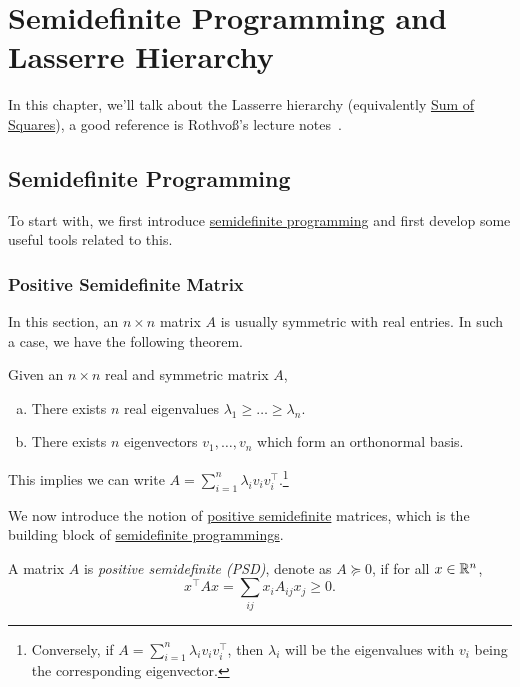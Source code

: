 \chapter{Semidefinite Programming and Lasserre Hierarchy}
In this chapter, we'll talk about the Lasserre hierarchy (equivalently \href{https://en.wikipedia.org/wiki/Sum-of-squares_optimization}{Sum of Squares}), a good reference is Rothvoß's lecture notes~\cite{LasserreHierarchy}.

\section{Semidefinite Programming}
To start with, we first introduce \hyperref[def:SDP]{semidefinite programming} and first develop some useful tools related to this.
\subsection{Positive Semidefinite Matrix}
In this section, an \(n\times n\) matrix \(A\) is usually symmetric with real entries. In such a case, we have the following theorem.

\begin{prev}
	Given an \(n\times n\) real and symmetric matrix \(A\),
	\begin{enumerate}[(a)]
		\item There exists \(n\) real eigenvalues \(\lambda _1 \geq \ldots \geq \lambda _n \).
		\item There exists \(n\) eigenvectors \(v_1, \ldots  , v_n\) which form an orthonormal basis.
	\end{enumerate}
	This implies we can write \(A = \sum_{i=1}^n \lambda _i v_i v_i ^{\top}\).\footnote{Conversely, if \(A= \sum_{i=1}^n \lambda _i v_i v_i ^{\top}  \), then \(\lambda _i\) will be the eigenvalues with \(v_i\) being the corresponding eigenvector.}
\end{prev}

We now introduce the notion of \hyperref[def:PSD]{positive semidefinite} matrices, which is the building block of \hyperref[def:SDP]{semidefinite programmings}.

\begin{definition}\label{def:PSD}
	A matrix \(A\) is \emph{positive semidefinite (PSD)}, denote as \(A \succeq 0\), if for all \(x\in \mathbb{\MakeUppercase{r}} ^n\),
	\[
		x^{\top} A x = \sum_{ij} x_i A_{ij} x_j \geq 0.
	\]
\end{definition}


